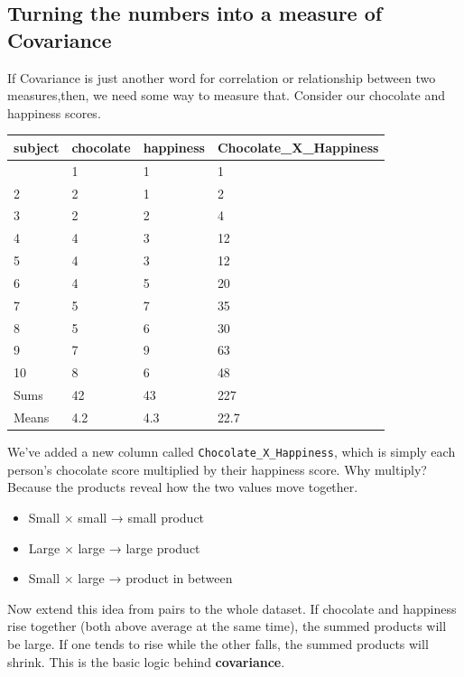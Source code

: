 \documentclass[
  letterpaper,
  DIV=11,
  numbers=noendperiod]{scrreprt}
\providecommand{\tightlist}{%
  \setlength{\itemsep}{0pt}\setlength{\parskip}{0pt}}
\begin{document}
\subsection{Turning the numbers into a measure of
Covariance}\label{turning-the-numbers-into-a-measure-of-covariance}

If Covariance is just another word for correlation or relationship
between two measures,then, we need some way to measure that. Consider
our chocolate and happiness scores.

\begin{longtable}[]{@{}llll@{}}
\toprule\noalign{}
subject & chocolate & happiness & Chocolate\_X\_Happiness \\
\midrule\noalign{}
\endhead
\bottomrule\noalign{}
\endlastfoot
1 & 1 & 1 & 1 \\
2 & 2 & 1 & 2 \\
3 & 2 & 2 & 4 \\
4 & 4 & 3 & 12 \\
5 & 4 & 3 & 12 \\
6 & 4 & 5 & 20 \\
7 & 5 & 7 & 35 \\
8 & 5 & 6 & 30 \\
9 & 7 & 9 & 63 \\
10 & 8 & 6 & 48 \\
Sums & 42 & 43 & 227 \\
Means & 4.2 & 4.3 & 22.7 \\
\end{longtable}

We've added a new column called \texttt{Chocolate\_X\_Happiness}, which
is simply each person's chocolate score multiplied by their happiness
score. Why multiply? Because the products reveal how the two values move
together.

\begin{itemize}
\tightlist
\item
  Small × small → small product
\item
  Large × large → large product
\item
  Small × large → product in between
\end{itemize}

Now extend this idea from pairs to the whole dataset. If chocolate and
happiness rise together (both above average at the same time), the
summed products will be large. If one tends to rise while the other
falls, the summed products will shrink. This is the basic logic behind
\textbf{covariance}.
\end{document}
